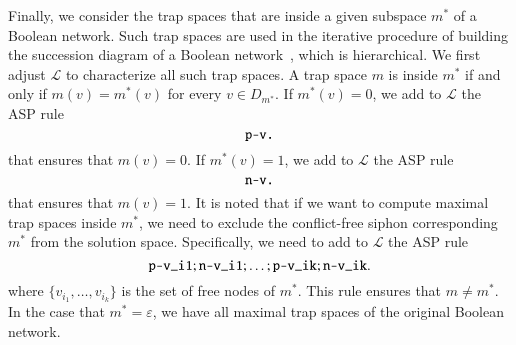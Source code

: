 \documentclass[preprint,12pt]{elsarticle}
\begin{document}
Finally, we consider the trap spaces that are inside a given subspace \(m^{*}\) of a Boolean network.
Such trap spaces are used in the iterative procedure of building the succession diagram of a Boolean network~\cite{Rozum2021}, which is hierarchical.
We first adjust \(\mathcal{L}\) to characterize all such trap spaces.
A trap space \(m\) is inside \(m^{*}\) if and only if \(m(v) = m^{*}(v)\) for every \(v \in D_{m^{*}}\).
If \(m^{*}(v) = 0\), we add to \(\mathcal{L}\) the ASP rule
\[
  \verb|p-v.|
\]
that ensures that \(m(v) = 0\).
If \(m^{*}(v) = 1\), we add to \(\mathcal{L}\) the ASP rule
\[
  \verb|n-v.|
\]
that ensures that \(m(v) = 1\).
It is noted that if we want to compute maximal trap spaces inside \(m^{*}\), we need to exclude the conflict-free siphon corresponding \(m^{*}\) from the solution space.
Specifically, we need to add to \(\mathcal{L}\) the ASP rule
\[
  \verb|p-v_i1| ; \verb|n-v_i1| ; \dots ; \verb|p-v_ik| ; \verb|n-v_ik|.
\]
where \(\{v_{i_1}, \dots, v_{i_k}\}\) is the set of free nodes of \(m^{*}\).
This rule ensures that \(m \neq m^{*}\).
In the case that \(m^{*} = \varepsilon\), we have all maximal trap spaces of the original Boolean network.
\end{document}
